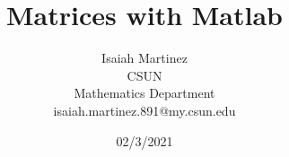 \documentclass[a4paper,10pt]{article}
\begin{document}
%
   \title{Matrices with Matlab}

   \author{Isaiah Martinez \\ CSUN \\ Mathematics Department \\ isaiah.martinez.891@my.csun.edu}
          
   \date{02/3/2021}

   \maketitle
   
   \tableofcontents
 
  \newpage
    

\end{document}
